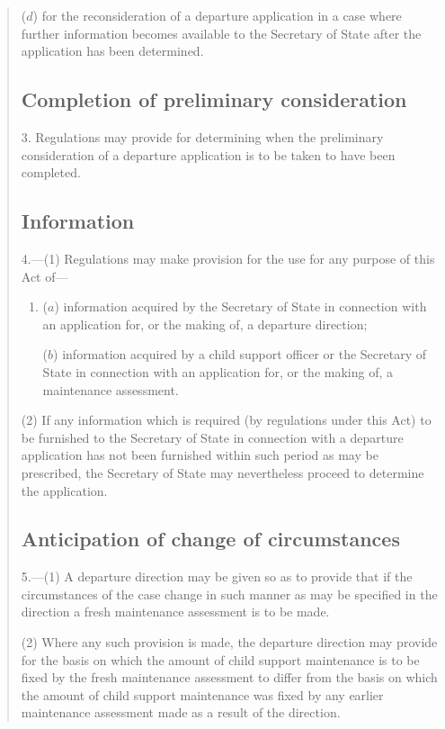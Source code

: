\documentclass[a4paper]{article}
\begin{document}
{\begin{quotation}
\begin{enumerate}
($d$) for the reconsideration of a departure application in a case where further information becomes available to the Secretary of State after the application has been determined.
\end{enumerate}

\subsection*{Completion of preliminary consideration}

3. Regulations may provide for determining when the preliminary consideration of a departure application is to be taken to have been completed.

\subsection*{Information}

4.---(1) Regulations may make provision for the use for any purpose of this Act of—
\begin{enumerate}\item[]
($a$) information acquired by the Secretary of State in connection with an application for, or the making of, a departure direction;

($b$) information acquired by a child support officer or the Secretary of State in connection with an application for, or the making of, a maintenance assessment.
\end{enumerate}

(2) If any information which is required (by regulations under this Act) to be furnished to the Secretary of State in connection with a departure application has not been furnished within such period as may be prescribed, the Secretary of State may nevertheless proceed to determine the application.

\subsection*{Anticipation of change of circumstances}

5.---(1) A departure direction may be given so as to provide that if the circumstances of the case change in such manner as may be specified in the direction a fresh maintenance assessment is to be made.

(2) Where any such provision is made, the departure direction may provide for the basis on which the amount of child support maintenance is to be fixed by the fresh maintenance assessment to differ from the basis on which the amount of child support maintenance was fixed by any earlier maintenance assessment made as a result of the direction.


\end{quotation}}
\end{document}
